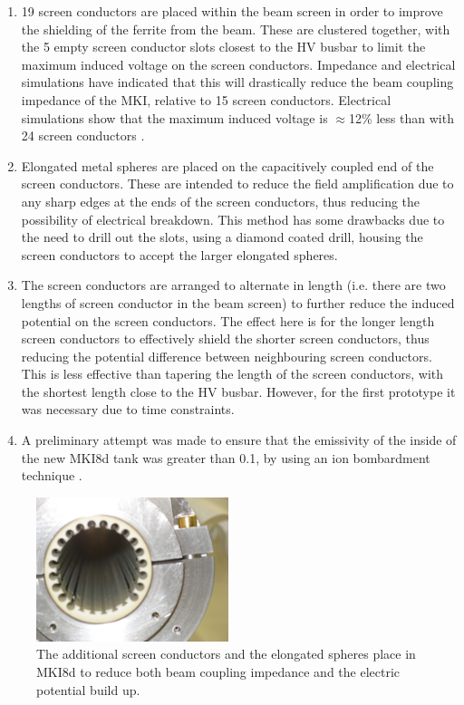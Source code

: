 \begin{enumerate}
\item{19 screen conductors are placed within the beam screen in order to improve the shielding of the ferrite from the beam. These are clustered together, with the 5 empty screen conductor slots closest to the HV busbar to limit the maximum induced voltage on the screen conductors. Impedance and electrical simulations have indicated that this will drastically reduce the beam coupling impedance of the MKI, relative to 15 screen conductors. Electrical simulations show that the maximum induced voltage is $\approx$12\% less than with 24 screen conductors \cite{Barnes:mkiElec}.}
\item{Elongated metal spheres are placed on the capacitively coupled end of the screen conductors. These are intended to reduce the field amplification due to any sharp edges at the ends of the screen conductors, thus reducing the possibility of electrical breakdown. This method has some drawbacks due to the need to drill out the slots, using a diamond coated drill, housing the screen conductors to accept the larger elongated spheres.}
\item{The screen conductors are arranged to alternate in length (i.e. there are two lengths of screen conductor in the beam screen) to further reduce the induced potential on the screen conductors. The effect here is for the longer length screen conductors to effectively shield the shorter screen conductors, thus reducing the potential difference between neighbouring screen conductors. This is less effective than tapering the length of the screen conductors, with the shortest length close to the HV busbar. However, for the first prototype it was necessary due to time constraints.}
\item{A preliminary attempt was made to ensure that the emissivity of the inside of the new MKI8d tank was greater than 0.1, by using an ion bombardment technique \cite{Barnes:mkiElec}.}
\end{enumerate}

\begin{figure}
\begin{center}
\includegraphics[width=0.5\textwidth]{LHC_MKI/figures/mki8d-balls.jpg}
\end{center}
\caption{The additional screen conductors and the elongated spheres place in MKI8d to reduce both beam coupling impedance and the electric potential build up.}
\label{fig:mki8d-points}
\end{figure}

